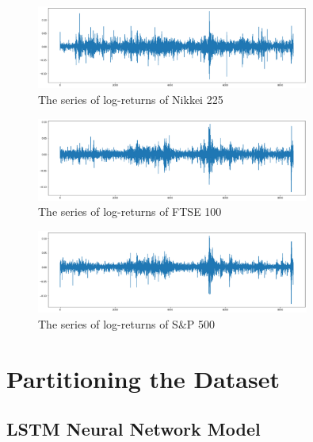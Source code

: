 \documentclass[a4paper,11pt,oneside]{book}
\begin{document}
\begin{figure}[!h]
	\centering
	\includegraphics[width=0.8\textwidth]{figures/logNikkei}
	\caption{The series of log-returns of Nikkei 225}
	\label{logNikkei}
\end{figure}

\begin{figure}[!h]
	\centering
	\includegraphics[width=0.8\textwidth]{figures/logFTSE}
	\caption{The series of log-returns of FTSE 100}
	\label{logFTSE}
\end{figure}


\begin{figure}[!h]
	\centering
	\includegraphics[width=0.8\textwidth]{figures/logS&P500}
	\caption{The series of log-returns of S\&P 500}
	\label{logSandP 500}
\end{figure}

\section{Partitioning the Dataset}
\subsection{LSTM Neural Network Model}
\end{document}
